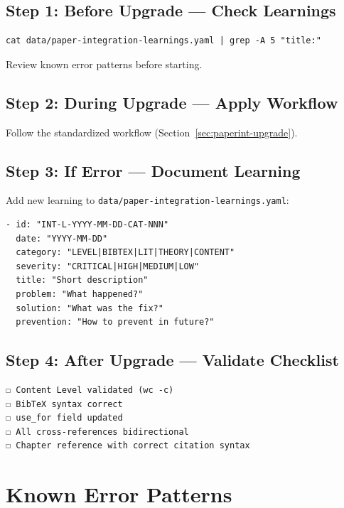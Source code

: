 \subsection{Step 1: Before Upgrade --- Check Learnings}

\begin{verbatim}
cat data/paper-integration-learnings.yaml | grep -A 5 "title:"
\end{verbatim}

Review known error patterns before starting.

\subsection{Step 2: During Upgrade --- Apply Workflow}

Follow the standardized workflow (Section~\ref{sec:paperint-upgrade}).

\subsection{Step 3: If Error --- Document Learning}

Add new learning to \texttt{data/paper-integration-learnings.yaml}:

\begin{verbatim}
- id: "INT-L-YYYY-MM-DD-CAT-NNN"
  date: "YYYY-MM-DD"
  category: "LEVEL|BIBTEX|LIT|THEORY|CONTENT"
  severity: "CRITICAL|HIGH|MEDIUM|LOW"
  title: "Short description"
  problem: "What happened?"
  solution: "What was the fix?"
  prevention: "How to prevent in future?"
\end{verbatim}

\subsection{Step 4: After Upgrade --- Validate Checklist}

\begin{verbatim}
☐ Content Level validated (wc -c)
☐ BibTeX syntax correct
☐ use_for field updated
☐ All cross-references bidirectional
☐ Chapter reference with correct citation syntax
\end{verbatim}


\section{Known Error Patterns}
\label{sec:paperint-errors}

